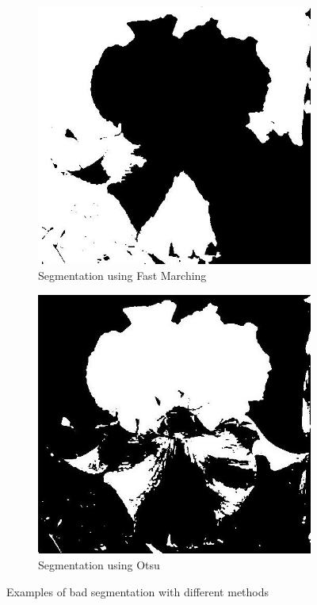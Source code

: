 \documentclass[11]{article}
\begin{document}
\begin{figure}[H]
    \begin{subfigure}[t]{0.45\textwidth}
    \centering
  \includegraphics[scale=0.25]{images/segmentation2.jpg}
    \caption{Segmentation using Fast Marching}
    \label{segmentation2}
    \end{subfigure}
    \begin{subfigure}[t]{0.45\textwidth}
    \centering
    \includegraphics[scale=0.25]{images/segmentation3.jpg}
    \caption{Segmentation using Otsu}
    \label{segmentation3}
    \end{subfigure}
    \label{segmentationALL}
    \caption{Examples of bad segmentation with different methods}
\end{figure}
\end{document}
